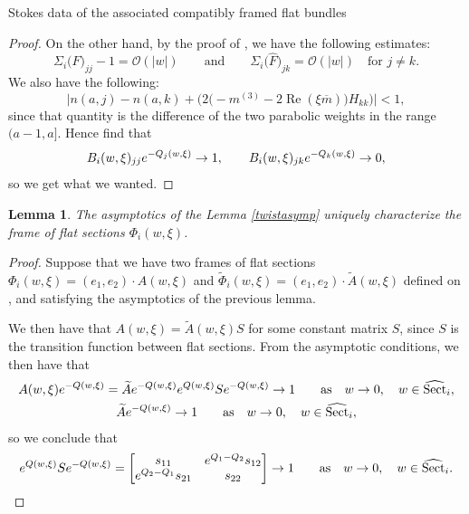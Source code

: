 \documentclass[11pt]{article}
\numberwithin{equation}{section}
\newtheorem{Lemma}[Theorem]{Lemma}
\numberwithin{equation}{section}
\begin{document}
\begin{subsubsection}{Stokes data of the associated compatibly framed flat bundles}
\begin{proof}
On the other hand, by the proof of \cite[Lemma 1]{B2}, we have the following estimates:
\[
\Sigma_i\bigl(\hat{F}\bigr)_{jj}-1=\mathcal{O}(|w|) \qquad \text{and}\qquad \Sigma_i\bigl(\hat{F}\bigr)_{jk}=\mathcal{O}(|w|) \quad \text{for $j\neq k$}.
\]
 We also have the following:
 \[
 \bigl|n(a,j)-n(a,k)+\bigl(2\bigl(-m^{(3)}-2\operatorname{Re}(\xi \overline{m})\bigr)H_{kk}\bigr)\bigr|<1,
 \]
 since that quantity is the difference of the two parabolic weights in the range $(a-1,a]$. Hence find that
\begin{equation*}
 B_i(w,\xi)_{jj}{\rm e}^{-Q_j(w,\xi)} \to 1, \qquad
 B_i(w,\xi)_{jk}{\rm e}^{-Q_k(w,\xi)} \to 0,
\end{equation*}
so we get what we wanted.
\end{proof}

\begin{Lemma}\label{UniqueA} The asymptotics of the Lemma {\rm\ref{twistasymp}} uniquely characterize the frame of flat sections $\Phi_i(w,\xi)$.
\end{Lemma}
\begin{proof}Suppose that we have two frames of flat sections $\Phi_i(w,\xi)=(e_1,e_2)\cdot A(w,\xi)$ and $\widetilde{\Phi}_i(w,\xi)=(e_1,e_2)\cdot \widetilde{A}(w,\xi)$ defined on , and satisfying the asymptotics of the previous lemma.

We then have that $A(w,\xi)=\widetilde{A}(w,\xi)S$ for some constant matrix $S$, since $S$ is the transition function between flat sections. From the asymptotic conditions, we then have that
\begin{gather*}
 A(w,\xi){\rm e}^{-Q(w,\xi)}=\widetilde{A}{\rm e}^{-Q(w,\xi)}{\rm e}^{Q(w,\xi)}S{\rm e}^{-Q(w,\xi)} \to 1 \qquad \text{as} \quad w \to 0,\quad w \in \widehat{\operatorname{Sect}}_i,\\
 \widetilde{A}{\rm e}^{-Q(w,\xi)}\to 1\qquad \text{as} \quad w \to 0,\quad w \in \widehat{\operatorname{Sect}}_i,
\end{gather*}
so we conclude that
\begin{equation*}
 {\rm e}^{Q(w,\xi)}S{\rm e}^{-Q(w,\xi)}=\begin{bmatrix} s_{11} & {\rm e}^{Q_1-Q_2}s_{12}\\
 {\rm e}^{Q_2-Q_1}s_{21} & s_{22}\\
 \end{bmatrix}\to 1 \qquad \text{as} \quad w \to 0,\quad w \in \widehat{\operatorname{Sect}}_i.
\end{equation*}


\end{proof}
\end{subsubsection}
\end{document}

